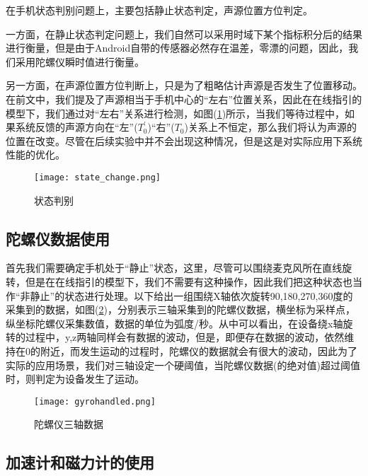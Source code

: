 \documentclass[winfonts,oneside]{njuthesis}
\begin{document}
			在手机状态判别问题上，主要包括静止状态判定，声源位置方位判定。
			
			一方面，在静止状态判定问题上，我们自然可以采用时域下某个指标积分后的结果进行衡量，但是由于Android自带的传感器必然存在温差，零漂的问题，因此，我们采用陀螺仪瞬时值进行衡量。
			
			另一方面，在声源位置方位判断上，只是为了粗略估计声源是否发生了位置移动。在前文中，我们提及了声源相当于手机中心的“左右”位置关系，因此在在线指引的模型下，我们通过对“左右”关系进行检测，如图(\ref{fig: state-change})所示，当我们等待过程中，如果系统反馈的声源方向在“左”($T_0^{'}$)“右”($T_0$)关系上不恒定，那么我们将认为声源的位置在改变。尽管在后续实验中并不会出现这种情况，但是这是对实际应用下系统性能的优化。
			
			\begin{figure}[H]
				\centering
				\texttt{[image: state\_change.png]} 
				\caption{{状态判别}}
				\label{fig: state-change}
			\end{figure}	
						
		\subsection{陀螺仪数据使用}	
		
			首先我们需要确定手机处于“静止”状态，这里，尽管可以围绕麦克风所在直线旋转，但是在在线指引的模型下，我们不需要有这种操作，因此我们把这种状态也当作“非静止”的状态进行处理。以下给出一组围绕X轴依次旋转90,180,270,360度的采集到的数据，如图(\ref{fig: gyro})，分别表示三轴采集到的陀螺仪数据，横坐标为采样点，纵坐标陀螺仪采集数值，数据的单位为弧度/秒。从中可以看出，在设备绕x轴旋转的过程中，y,z两轴同样会有数据的波动，但是，即便存在数据的波动，依然维持在0的附近，而发生运动的过程时，陀螺仪的数据就会有很大的波动，因此为了实际的应用场景，我们对三轴设定一个硬阈值，当陀螺仪数据(的绝对值)超过阈值时，则判定为设备发生了运动。
		
			\begin{figure}[H]
				\centering
				\texttt{[image: gyrohandled.png]} 
				\caption{{陀螺仪三轴数据}}
				\label{fig: gyro}
			\end{figure}
		
		\subsection{加速计和磁力计的使用}	
			
\end{document}
